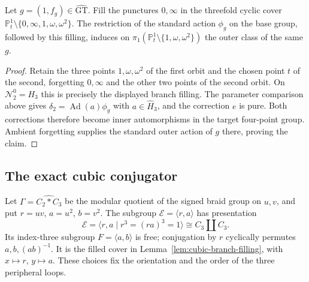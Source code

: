 \begin{lemma}\label{lem:cubic-branch-filling}
Let $g=(1,f_g)\in\widehat{\mathrm{GT}}$.
Fill the punctures $0,\infty$ in the threefold cyclic cover
$\mathbb P^1_t\setminus\{0,\infty,1,\omega,\omega^2\}$.
The restriction of the standard action $\phi_g$ on the
base group, followed by this filling, induces on
$\pi_1(\mathbb P^1_t\setminus\{1,\omega,\omega^2\})$
the outer class of the same $g$.
\end{lemma}
\begin{proof}
Retain the three points $1,\omega,\omega^2$ of the first
orbit and the chosen point $t$ of the second, forgetting
$0,\infty$ and the other two points of the second orbit.
On $\mathcal N_2^0=H_3$ this is precisely the displayed branch
filling. The parameter comparison above gives
$\delta_2=\operatorname{Ad}(a)\phi_g$ with
$a\in\widehat H_3$, and the correction $e$ is pure.
Both corrections therefore become inner automorphisms in
the target four-point group. Ambient forgetting supplies
the standard outer action of $g$ there, proving the claim.
\end{proof}

\subsection{The exact cubic conjugator}

Let $\Gamma=\widehat{C_2*C_3}$ be the modular quotient of
the signed braid group on $u,v$, and put $r=uv$,
$a=u^2$, $b=v^2$. The subgroup $\mathcal E=\langle r,a\rangle$
has presentation
\[
 \mathcal E=\langle r,a\mid r^3=(ra)^3=1\rangle
       \cong C_3\amalg C_3.
\]
Its index-three subgroup $F=\langle a,b\rangle$ is free;
conjugation by $r$ cyclically permutes $a,b,(ab)^{-1}$.
It is the filled cover in Lemma~\ref{lem:cubic-branch-filling},
with $x\mapsto r$, $y\mapsto a$. These choices fix the
orientation and the order of the three peripheral loops.

